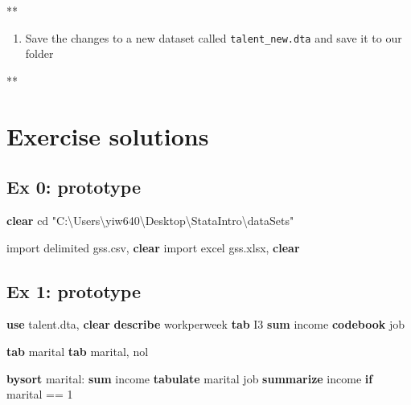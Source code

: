 \documentclass[
]{book}
\newenvironment{Shaded}{\begin{snugshade}}{\end{snugshade}}
\newcommand{\KeywordTok}[1]{\textcolor[rgb]{0.13,0.29,0.53}{\textbf{#1}}}
\newcommand{\NormalTok}[1]{#1}
\newcommand{\StringTok}[1]{\textcolor[rgb]{0.31,0.60,0.02}{#1}}
\providecommand{\tightlist}{%
  \setlength{\itemsep}{0pt}\setlength{\parskip}{0pt}}
\begin{document}
\begin{Shaded}
\begin{Highlighting}[]
\NormalTok{**}
\end{Highlighting}
\end{Shaded}

\begin{enumerate}
\def\labelenumi{\arabic{enumi}.}
\setcounter{enumi}{7}
\tightlist
\item
  Save the changes to a new dataset called \texttt{talent\_new.dta} and save it to our folder
\end{enumerate}

\begin{Shaded}
\begin{Highlighting}[]
\NormalTok{**}
\end{Highlighting}
\end{Shaded}

\hypertarget{exercise-solutions-6}{%
\section{Exercise solutions}\label{exercise-solutions-6}}

\hypertarget{ex-0-prototype-6}{%
\subsection{Ex 0: prototype}\label{ex-0-prototype-6}}

\begin{Shaded}
\begin{Highlighting}[]
\KeywordTok{clear}
\NormalTok{cd }\StringTok{"C:\textbackslash{}Users\textbackslash{}yiw640\textbackslash{}Desktop\textbackslash{}StataIntro\textbackslash{}dataSets"}

\NormalTok{import delimited gss.csv, }\KeywordTok{clear}
\NormalTok{import excel gss.xlsx, }\KeywordTok{clear}
\end{Highlighting}
\end{Shaded}

\hypertarget{ex-1-prototype-6}{%
\subsection{Ex 1: prototype}\label{ex-1-prototype-6}}

\begin{Shaded}
\begin{Highlighting}[]
\KeywordTok{use}\NormalTok{ talent.dta, }\KeywordTok{clear}
\KeywordTok{describe}\NormalTok{ workperweek}
\KeywordTok{tab}\NormalTok{ I3}
\KeywordTok{sum}\NormalTok{ income}
\KeywordTok{codebook}\NormalTok{ job}

\KeywordTok{tab}\NormalTok{ marital}
\KeywordTok{tab}\NormalTok{ marital, nol}

\KeywordTok{bysort}\NormalTok{ marital: }\KeywordTok{sum}\NormalTok{ income}
\KeywordTok{tabulate}\NormalTok{ marital job}
\KeywordTok{summarize}\NormalTok{ income }\KeywordTok{if}\NormalTok{ marital == 1}
\end{Highlighting}
\end{Shaded}
\end{document}

